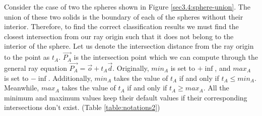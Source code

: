 \documentclass[a4paper,11pt,oneside]{article}
\begin{document}
Consider the case of two the spheres shown in Figure \ref{sec3.4:sphere-union}. The union of these two solids is the boundary of each of the spheres without their interior. Therefore, to find the correct classification results we must find the closest intersection from our ray origin such that it does not belong to the interior of the sphere. Let us denote the intersection distance from the ray origin to the point as $t_A$. $\vec{P_A}$ is the intersection point which we can compute through the general ray equation $\vec{P_A} = \vec{o} + t_{A}\vec{d}$. Originally, $min_A$ is set to $+\inf$, and $max_A$ is set to $-\inf$. Additionally, $min_A$ takes the value of $t_A$ if and only if $t_A \leq min_A$. Meanwhile, $max_A$ takes the value of $t_A$ if and only if $t_A \geq max_A$. All the minimum and maximum values keep their default values if their corresponding intersections don't exist. (Table \ref{table:notations2})
\end{document}
